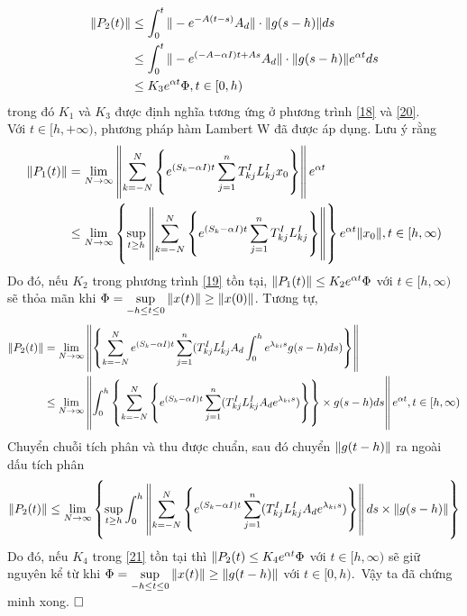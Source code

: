 \begin{cm}
\begin{align}
\end{align}
\begin{align}\label{26}
	\Vert P_2(t) \Vert &\le \int_{0}^{t}\Vert -e^{-A(t-s )}A_d \Vert \cdot \Vert g(s  - h) \Vert ds  \notag\\
	&\le \int_{0}^{t}\Vert -e^{(-A - \alpha I)t + As }A_d \Vert \cdot \Vert g(s  - h) \Vert e^{\alpha t}ds  \notag\\
	&\le K_3e^{\alpha t}	\Phi, t \in [0,h)
\end{align}
trong đó $K_1$ và $K_3$ được định nghĩa tương ứng ở phương trình \eqref{18} và \eqref{20}.\\
Với $t\in [h,+\infty)$, phương pháp hàm Lambert W đã được áp dụng. Lưu ý rằng
\begin{align}\label{27}
	\Vert P_1(t) \Vert &= \lim\limits_{N \to \infty} \left \Vert \sum_{k=-N}^{N} \left\{ e^{(S_k-\alpha I)t} \sum_{j =1}^n T^I_{kj}L^I_{kj}x_0\right\} \right \Vert e^{\alpha t} \notag\\
	& \le \lim \limits_{N \to \infty} \left\{ \sup \limits_{t \ge h} \left \Vert \sum_{k=-N}^{N} \left\{ e^{(S_k - \alpha I)t} \sum_{j =1}^n T^I_{kj} L^I_{kj}\right\} \right \Vert\right\} e^{\alpha t} \Vert x_0 \Vert, t \in [h,\infty)
\end{align}
Do đó, nếu $K_2$ trong phương trình \eqref{19} tồn tại, $\Vert P_1(t) \Vert \le K_2 e^{\alpha t} \Phi$ với $t \in [h,\infty)$ sẽ thỏa mãn khi $\Phi = \sup \limits_{-h \le t \le 0} \Vert x(t)\Vert \ge \Vert x(0)\Vert$. Tương tự,
\begin{align}\label{28}
	\Vert P_2(t)\Vert &= \lim\limits_{N \to \infty} \left \Vert \left\{  \sum_{k=-N}^N e^{(S_k - \alpha I)t} \sum_{j =1}^n (T^I_{kj}L^I_{kj}A_d \int_0^h e^{\lambda_{ki}s } g(s  - h) ds )  \right\} \right \Vert \notag\\
	& \le \lim\limits_{N\to \infty} \left \Vert \int_0^h \left\{ \sum_{k=-N}^N \left\{ e^{(S_k - \alpha I)t} \sum_{j=1}^n (T^I_{kj} L^I_{kj}A_de^{\lambda_{ki}s })\right\}\right\} \times g(s  - h) d s  \right \Vert e^{\alpha t}, t \in [h,\infty)
	\end{align}
Chuyển chuỗi tích phân và thu được chuẩn, sau đó chuyển $\Vert g(t-h)\Vert$ ra ngoài dấu tích phân
\begin{align}\label{29}
	\Vert P_2(t) \Vert \le \lim \limits_{N\to \infty} \left \{ \sup \limits_{t \ge h} \int_0^h \left \Vert \sum_{k=-N}^N \left\{ e^{(S_k - \alpha I)t} \sum_{j =1}^n (T^I_{kj}L^I_{kj}A_de^{\lambda_{ki}s })\right\} \right \Vert ds  \times \Vert g(s  - h)\Vert \right\}
\end{align}
Do đó, nếu $K_4$ trong \eqref{21} tồn tại thì $\Vert P_2(t) \le K_4e^{\alpha t} \Phi$ với $t \in [h,\infty)$ sẽ giữ nguyên kể từ khi $\Phi = \sup \limits_{-h \le t \le 0} \Vert x(t) \Vert \ge \Vert g(t-h)\Vert$ với $t \in [0,h)$.\ 
Vậy ta đã chứng minh xong. $\hfill \square$
\end{cm}

